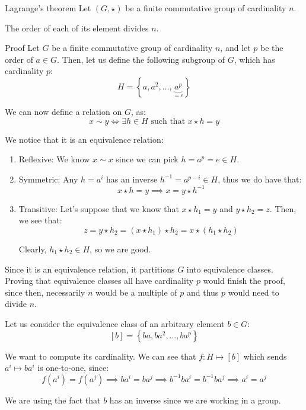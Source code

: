\documentclass[a4paper]{article}
\begin{document}
\begin{parag}{Lagrange's theorem}
    Let $\left(G, \star\right)$ be a finite commutative group of cardinality $n$.

    The order of each of its element divides $n$.

    \begin{subparag}{Proof}
        Let $G$ be a finite commutative group of cardinality $n$, and let $p$ be the order of $a \in G$. Then, let us define the following subgroup of $G$, which has cardinality $p$:
        \[H = \left\{a, a^2, \ldots, \underbrace{a^p}_{= e}\right\}\]

        We can now define a relation on $G$, as:
        \[x \sim y \iff \exists h \in H \text{ such that } x \star h = y\]

        We notice that it is an equivalence relation:
        \begin{enumerate}
            \item Reflexive: We know $x \sim x$ since we can pick $h = a^p = e \in H$.
            \item Symmetric: Any $h = a^i$ has an inverse $h^{-1} = a^{p - i} \in H$, thus we do have that:
            \[x \star h = y \implies x = y \star h^{-1}\]
            \item Transitive: Let's suppose that we know that $x \star h_1 = y$ and $y \star h_2 = z$. Then, we see that:
                \[z = y \star h_2 = \left(x \star h_1\right) \star h_2 = x \star \left(h_1 \star h_2\right)\]

                Clearly, $h_1 \star h_2 \in H$, so we are good.
        \end{enumerate}

        Since it is an equivalence relation, it partitions $G$ into equivalence classes. Proving that equivalence classes all have cardinality $p$ would finish the proof, since then, necessarily $n$ would be a multiple of $p$ and thus $p$ would need to divide $n$.

        Let us consider the equivalence class of an arbitrary element $b \in G$:
        \[\left[b\right] = \left\{ba, ba^2, \ldots, ba^p\right\}\]

        We want to compute its cardinality. We can see that $f: H \mapsto \left[b\right]$ which sends $a^i \mapsto ba^i$ is one-to-one, since:
        \[f\left(a^i\right) = f\left(a^j\right) \implies ba^i = ba^j \implies b^{-1} b a^i = b^{-1} b a^j \implies a^i = a^j\]

        We are using the fact that $b$ has an inverse since we are working in a group.


\end{subparag}
\end{parag}
\end{document}
